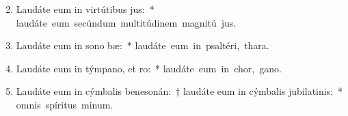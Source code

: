\begin{flushleft}
\begin{enumerate}[leftmargin=*]
\setcounter{enumi}{1}


\item Laudáte eum in virtútibus jus:~* \mbox{laudáte eum secúndum multitúdinem magnitú jus.}
\item Laudáte eum in sono bæ:~* \mbox{laudáte eum in psaltéri,  thara.}
\item Laudáte eum in týmpano, et ro:~* \mbox{laudáte eum in chor,  gano.}
\item Laudáte eum in cýmbalis benesonán:~† laudáte eum in cýmbalis jubilatinis:~* \mbox{omnis spíritus  minum.}

\end{enumerate}
\end{flushleft}

